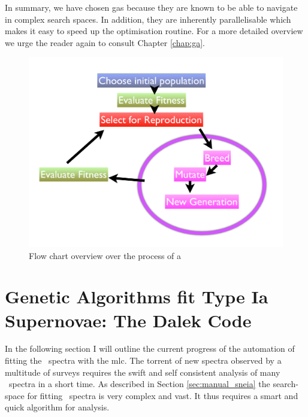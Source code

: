 In summary, we have chosen \glspl{ga} because they are known to be able to navigate in complex search spaces. In addition, they are inherently parallelisable which makes it easy to speed up the optimisation routine. For a more detailed overview we urge the reader again to consult Chapter \ref{chap:ga}.

\begin{figure}[htbp] %
   \centering
   \includegraphics[width=\textwidth]{chapter_dalek/plots/ga_overview.pdf} 
   \caption{Flow chart overview over the process of a }
   \label{fig:ga_overview}
\end{figure}



\section{Genetic Algorithms fit Type Ia Supernovae: The Dalek Code}
\label{sec:dalek}

In the following section I will outline the current progress of the automation of fitting the \sneia\ spectra with the \gls{mlc}. The torrent of new spectra observed by a multitude of surveys requires the swift and self consistent analysis of many \sneia\ spectra in a short time. As described in Section \ref{sec:manual_sneia} the search-space for fitting \sneia\ spectra is very complex and vast. It thus requires a smart and quick algorithm for analysis.


